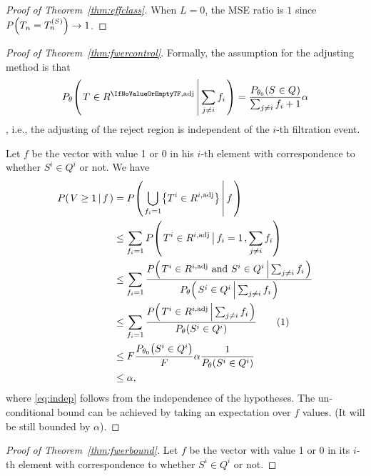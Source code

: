 \documentclass[ejs, twoside]{imsart}
\theoremstyle{plain}
\theoremstyle{remark}
\newcommand{\andtext}{\ \mathrm{and}\ }
\newcommand{\comma}{\text{,}}
\newcommand{\cond}[2]{\left.{#1}\,\middle|\,{#2}\right.}
\numberwithin{equation}{section}
\numberwithin{table}{section}
\numberwithin{figure}{section}
\let\originalleft\left
\let\originalright\right
\renewcommand{\left}{\mathopen{}\mathclose\bgroup\originalleft}
\renewcommand{\right}{\aftergroup\egroup\originalright}
\begin{document}
\begin{appendix}
\begin{proof}[Proof of Theorem~\ref{thm:effclass}]
	When \(L = 0\), the MSE ratio is \(1\) since \(P\left(\estimreg = \estimfil \right) \to 1 \). 
\end{proof}

\begin{proof}[Proof of Theorem~\ref{thm:fwercontrol}]
		Formally, the assumption for the adjusting method is that \[P_{\theta}\left(\cond{\baserejeventadj}{\sum_{j\neq i}f_i} \right) = \frac{P_{\theta_0}\left( \nfilevent \right)}{\sum_{j\neq i}f_i+1} \alpha \], i.e., the adjusting of the reject region is independent of the \(i\)-th filtration event.
	
	Let \(f\) be the vector with value 1 or 0 in his \(i\)-th element with correspondence to whether \(S^i \in Q^i\) or not. We have
	\begin{align*}
		P\left(\cond{V \geq 1 }{f}\right)
		&= P\left(\cond{\bigcup_{f_i=1} \left\lbrace T^i \in R^{i,\text{adj}} \right\rbrace }{ f}  \right) \\
		&\leq \sum_{f_i=1} P\left( \cond{ T^i \in R^{i,\text{adj}}  }{ {f_i = 1} }, \sum_{j\neq i}f_i \right) \\
		&\leq \sum_{f_i=1} \frac{P\left(\cond{ T^i \in R^{i,\text{adj}} \andtext S^i \in Q^i}{\sum_{j\neq i}f_i} \right)}{P_\theta \left(\cond{S^i \in Q^i}{\sum_{j\neq i}f_i} \right)} \\
		&\leq \sum_{f_i=1} \frac{P\left( \cond{ T^i \in R^{i,\text{adj}}}{\sum_{j\neq i}f_i} \right)}{P_\theta \left(S^i \in Q^i\right)}  \stepcounter{equation}\tag{\theequation}\label{eq:indep}\\
		&\leq F \frac{P_{\theta_0}\left(\nfilevent[i] \right)}{F} \alpha \frac{1}{P_\theta \left(S^i \in Q^i\right)} \\
		&\leq \alpha \comma
	\end{align*}
	where \eqref{eq:indep} follows from the independence of the hypotheses.
	The un-conditional bound can be achieved by taking an expectation over \(f\) values. (It will be still bounded by \(\alpha\)).
\end{proof}

\begin{proof}[Proof of Theorem~\ref{thm:fwerbound}]


	Let \(f\) be the vector with value 1 or 0 in its \(i\)-th element with correspondence to whether \(S^i \in Q^i\) or not.
	

\end{proof}
\end{appendix}
\end{document}
